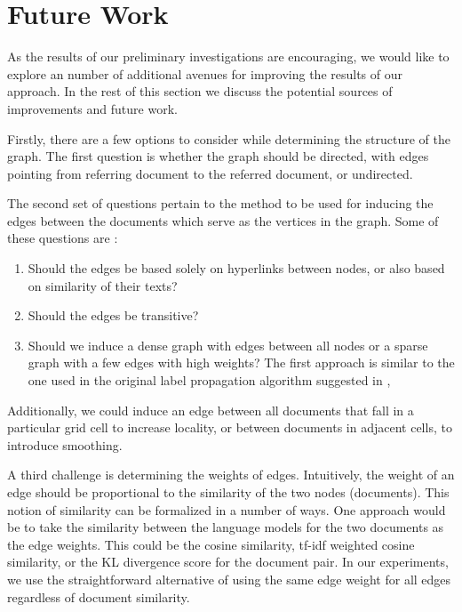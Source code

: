 \section{Future Work}  

As the results of our preliminary investigations are encouraging, we would
like to explore an number of additional avenues for improving the results of
our approach. In the rest of this section we discuss the potential sources of
improvements and future work.

\par Firstly, there are a few options to consider while determining the
structure of the graph. The first question is whether the graph should be
directed, with edges pointing from referring document to the referred
document, or undirected.

\par The second set of questions pertain to the method to be used for inducing
the edges between the documents which serve as the vertices in the graph. Some
of these questions are :

\begin{enumerate}
    \item Should the edges be based solely on hyperlinks between nodes, or also based on similarity of their texts?
    \item Should the edges be transitive?
    \item Should we induce a dense graph with edges between all nodes or a sparse graph with a few edges with high weights? The first approach is similar to the one used in the original label propagation algorithm suggested in , 
\end{enumerate}

Additionally, we could induce an edge between all documents that fall in a
particular grid cell to increase locality, or between documents in adjacent
cells, to introduce smoothing.

\par A third challenge is determining the weights of edges. Intuitively, the
weight of an edge should be proportional to the similarity of the two nodes
(documents). This notion of similarity can be formalized in a number of ways.
One approach would be to take the similarity between the language models for
the two documents as the edge weights. This could be the cosine similarity,
tf-idf weighted cosine similarity, or the KL divergence score for the document
pair.  In our experiments, we use the straightforward alternative of using the
same edge weight for all edges regardless of document similarity.

